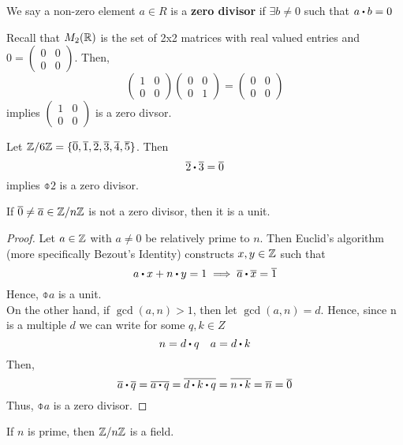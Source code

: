\documentclass[../Main.tex]{subfiles}
\begin{document}
\begin{dfn}[title=Zero Divisor]
	We say a non-zero element $a\in R$ is a \textbf{zero divisor} if $\exists b \ne 0$ such that $a\rdot b=0$
\end{dfn}
\begin{example}
	Recall that $M_2(\mathbb{R})$ is the set of 2x2 matrices with real valued entries and $0 = \begin{pmatrix}
		0&0\\0&0
	\end{pmatrix}$. Then,
	\[\begin{pmatrix}
	1&0\\0&0
	\end{pmatrix}\begin{pmatrix}
	0&0\\0&1
	\end{pmatrix}=\begin{pmatrix}
	0&0\\0&0
	\end{pmatrix}\]
	implies $\begin{pmatrix}
	1&0\\0&0
	\end{pmatrix}$ is a zero divsor.
\end{example}
\begin{example}
	Let $\mathbb{Z}/6\mathbb{Z} = \{\overline{0},\overline{1},\overline{2},\overline{3},\overline{4},\overline{5} \}$. Then
	\[\obar{2}\rdot \obar{3} = \obar{0} \]
	implies $\obar{2}$ is a zero divisor.
\end{example}
\begin{claim}
	If $\overline{0}\ne\overline{a}\in \mathbb{Z}/n\mathbb{Z}$ is not a zero divisor, then it is a unit.
\end{claim}
\begin{proof}
	Let $a\in\mathbb{Z}$ with $a\ne0$ be relatively prime to $n$. Then Euclid's algorithm (more specifically Bezout's Identity) constructs $x,y\in \mathbb{Z}$ such that\
	\[a\rdot x+n\rdot y=1 \implies \obar{a}\rdot \obar{x}=\obar{1}\]
	Hence, $\obar{a}$ is a unit.\\
	On the other hand, if $\gcd(a,n)>1$, then let $\gcd(a,n)=d$. Hence, since n is a multiple $d$ we can write for some $q,k\in Z$
	\[n=d\rdot q \quad a = d\rdot k\]
	Then,
	\[\obar{a}\rdot \obar{q}=\obar{a\rdot q}= \obar{d\rdot k\rdot q} = \obar{n \rdot k}=\obar{n}=\obar{0}\] 
	Thus, $\obar{a}$ is a zero divisor.
\end{proof}
\begin{crl}[title= $\modZ{n}$ is a field for prime $n$]
	If $n$ is prime, then $\mathbb{Z}/n\mathbb{Z}$ is a field.
\end{crl}
\end{document}
